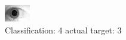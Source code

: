 \begin{figure}[h!]
\begin{center}
\includegraphics[width=0.60\columnwidth]{figures/ID1975_class_4_target_3.png}
\end{center}
\caption{ Classification: 4 actual target: 3}
\label{fig:ID1975_class_4_target_3}
\end{figure}
